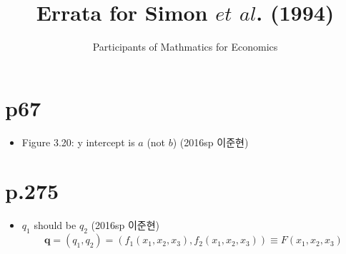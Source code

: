 \documentclass[a4paper]{article}
\title{Errata for Simon $et$ $al$. (1994)}
\author{Participants of Mathmatics for Economics}
\begin{document}
\maketitle
\section{p67} %
\label{sec:p67}
\begin{itemize}
	\item Figure 3.20: y intercept is $a$ (not $b$) (2016sp 이준현)
\end{itemize}

\section{p.275} %
\label{sec:p_275}
\begin{itemize}
	\item $q_1$ should be $q_2$ (2016sp 이준현)
	\[
		\mathbf{q}=(q_1,q_2)=\left(f_1(x_1,x_2,x_3),f_2(x_1,x_2,x_3)\right)\equiv F(x_1,x_2,x_3)
	\]
\end{itemize}
\end{document}
